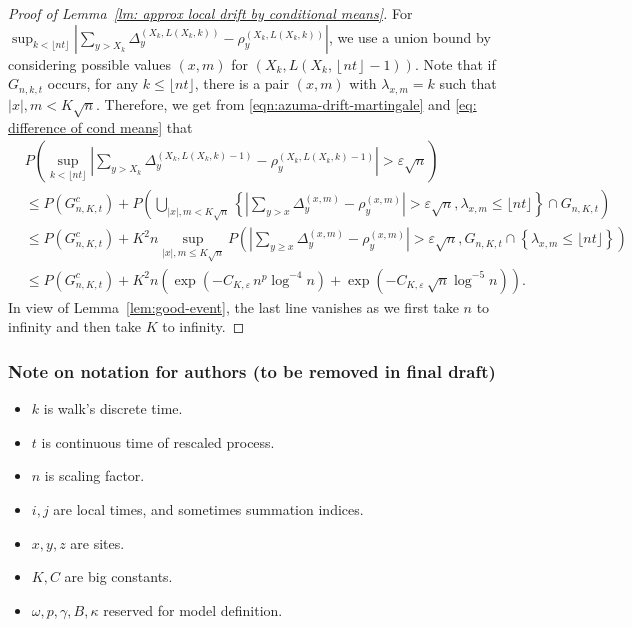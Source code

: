 \documentclass[twoside,12pt, a4paper]{article}
\numberwithin{equation}{section}
\theoremstyle{remark}
\newcommand{\abs}[1]{\left\vert #1 \right\vert}
\begin{document}
\begin{proof}[Proof of Lemma~\ref{lm: approx local drift by conditional means}]
	For $\sup_{k <\lfloor nt \rfloor} \left| \sum_{y > X_k} \Delta_y^{\left(X_k,L(X_k, k)\right)} - \rho_y^{\left(X_k,L(X_k, k)\right)} \right|$, we use a union bound by considering possible values $(x,m)$ for $\left(X_k, L\left(X_k, \left\lfloor nt  \right\rfloor - 1\right)\right)$. Note that if $G_{n,k,t}$ occurs, for any $k\leq \lfloor nt \rfloor$, there is a pair $(x,m)$ with $\lambda_{x,m}=k$ such that $\abs{x},m <K\sqrt{n}$. Therefore, we get from \eqref{eqn:azuma-drift-martingale} and \eqref{eq: difference of cond means} that 
	\begin{align*}
		& P\left( \sup_{k <\lfloor nt \rfloor} \left| \sum_{y > X_k} 
		\Delta_y^{\left(X_k,L(X_k, k)-1\right)} - \rho_y^{\left(X_k,L(X_k, k)-1\right)}
		\right| > \varepsilon \sqrt{n}  \right) \\
		&\le P(G_{n, K, t}^c) + P\left( \bigcup_{|x|, m < K \sqrt{n} } \left\{  \left| \sum_{y > x} \Delta_y^{(x,m)} - \rho_y^{(x,m)} \right|  > \varepsilon \sqrt{n},  \lambda_{x,m} \leq\lfloor nt \rfloor \right\} \cap G_{n,K,t} \right) \\
		&\le P(G_{n, K, t}^c) + K^2 n \sup _{|x|, m \le  K \sqrt{n} }
		P\left( \left| \sum_{y \ge x} \Delta_y^{(x,m)} - \rho_y^{(x,m)} \right|  > \varepsilon \sqrt{n} , G_{n,K,t}\cap \left\{\lambda_{x,m} \leq\lfloor nt \rfloor \right\}  \right) \\
		&\le P(G_{n, K, t}^c) + K^2 n \left( \exp\left( - C_{K, \varepsilon} \, n^{p } \log^{-4} n \right) + \exp\left( - C_{K, \varepsilon} \, \sqrt{n}  \log^{-5} n \right)\right) 
		.\end{align*}
	In view of Lemma~\ref{lem:good-event}, the last line vanishes as we first take $n$ to infinity and then take $K$ to infinity.
\end{proof}

	\subsubsection{Note on notation for authors (to be removed in final draft)}
	
	\begin{itemize}
		\item $k$ is walk's discrete time.
		\item $t$ is continuous time of rescaled process.
		\item $n$ is scaling factor.
		\item $i, j$ are local times, and sometimes summation indices.
		\item $x, y, z$ are sites.
		\item $K, C$ are big constants.
		\item $\omega, p, \gamma, B, \kappa$ reserved for model definition.
	\end{itemize}	
\end{document}
